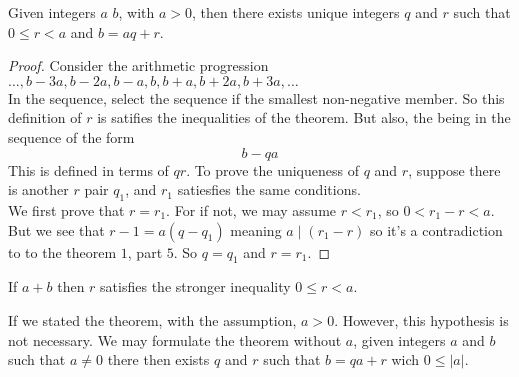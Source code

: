 \documentclass[11pt]{article}
\begin{document}
\begin{theorem}
    Given integers $a$ $b$, with $a > 0$, then there exists unique integers $q$ and $r$ such that $0 \leq r < a$ and $b = aq + r$.
\end{theorem}
\begin{proof}
    Consider the arithmetic progression $\ldots, b - 3a, b - 2a, b - a, b, b + a, b + 2a, b + 3a, \ldots $ \\
    In the sequence, select the sequence if the smallest non-negative member. So this definition of $r$ is satifies the inequalities of the theorem. But also, the being in the sequence of the form \[ b - qa\] This is defined in terms of $qr$. To prove the uniqueness of $q$ and $r$,
    suppose there is another $r$ pair $q_1$, and $r_1$ satiesfies the same
    conditions.\\ We first prove that $r = r_1$. For if not, we may assume $r <
        r_1$, so $0 < r_1 - r < a$. But we see that \(r - 1 = a(q - q_1) \) meaning \(a
    \mid (r_1 - r)\) so it's a contradiction to to the theorem $1$, part $5$. So $q
        = q_1$ and $r = r_1$.
\end{proof}
\begin{fact}
    If $a + b$ then $r$ satisfies the stronger inequality $0 \leq r < a$.
\end{fact}

\begin{fact}
    If we stated the theorem, with the assumption, $a > 0$. However, this hypothesis is not necessary. We may formulate the theorem without $a$, given integers $a$ and $b$ such that $a \neq 0$ there then exists $q$ and $r$ such that $b = qa + r$ wich $0 \leq |a|$.
\end{fact}
\end{document}
